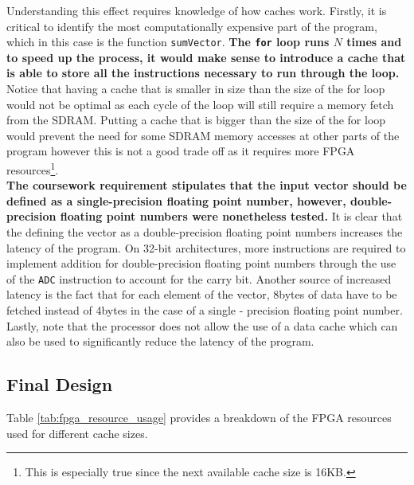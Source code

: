 \documentclass{article}
\begin{document}
Understanding this effect requires knowledge of how caches work. Firstly, it is critical to identify the most computationally expensive part of the program, which in this case is the function {\tt sumVector}. \textbf{The {\tt for} loop runs $N$ times and to speed up the process, it would make sense to introduce a cache that is able to store all the instructions necessary to run through the loop.} Notice that having a cache that is smaller in size than the size of the for loop would not be optimal as each cycle of the loop will still require a memory fetch from the SDRAM. Putting a cache that is bigger than the size of the for loop would prevent the need for some SDRAM memory accesses at other parts of the program however this is not a good trade off as it requires more FPGA resources\footnote{This is especially true since the next available cache size is 16KB.}. \\

\textbf{The coursework requirement stipulates that the input vector should be defined as a single-precision floating point number, however, double-precision floating point numbers were nonetheless tested.} It is clear that the defining the vector as a double-precision floating point numbers increases the latency of the program. On 32-bit architectures, more instructions are required to implement addition for double-precision floating point numbers through the use of the {\tt ADC} instruction to account for the carry bit. Another source of increased latency is the fact that for each element of the vector, 8bytes of data have to be fetched instead of 4bytes in the case of a single - precision floating point number. Lastly, note that the processor does not allow the use of a data cache which can also be used to significantly reduce the latency of the program. \\

\newpage
\subsection{Final Design}

Table \ref{tab:fpga_resource_usage} provides a breakdown of the FPGA resources used for different cache sizes. 
\end{document}
